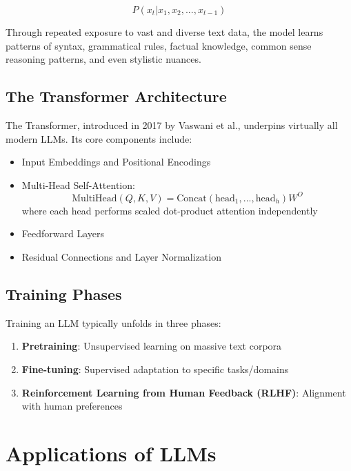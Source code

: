 \documentclass[openany]{book}
\begin{document}
\begin{equation}
P(x_t | x_1, x_2, ..., x_{t-1})
\end{equation}

Through repeated exposure to vast and diverse text data, the model learns 
patterns of syntax, grammatical rules, factual knowledge, common sense reasoning 
patterns, and even stylistic nuances.

\subsection{The Transformer Architecture}
The Transformer, introduced in 2017 by Vaswani et al., underpins virtually all 
modern LLMs. Its core components include:

\begin{itemize}
    \item Input Embeddings and Positional Encodings
    \item Multi-Head Self-Attention:
    \begin{equation}
        \text{MultiHead}(Q, K, V) = \text{Concat}(\text{head}_1, ..., 
        \text{head}_h)W^O
    \end{equation}
    where each head performs scaled dot-product attention independently
    \item Feedforward Layers
    \item Residual Connections and Layer Normalization
\end{itemize}

\subsection{Training Phases}
Training an LLM typically unfolds in three phases:

\begin{enumerate}
    \item \textbf{Pretraining}: Unsupervised learning on massive text corpora
    \item \textbf{Fine-tuning}: Supervised adaptation to specific tasks/domains
    \item \textbf{Reinforcement Learning from Human Feedback (RLHF)}: Alignment
     with human preferences
\end{enumerate}

\section{Applications of LLMs}
\end{document}
